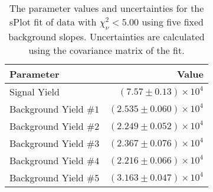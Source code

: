 
\begin{table}[ht]
    \begin{center}
        \begin{tabular}{lr}\toprule
            Parameter & Value \\\midrule
            Signal Yield & $(7.57 \pm 0.13) \times 10^{4}$ \\
            Background Yield $\#1$ & $(2.535 \pm 0.060) \times 10^{4}$ \\
            Background Yield $\#2$ & $(2.249 \pm 0.052) \times 10^{4}$ \\
            Background Yield $\#3$ & $(2.367 \pm 0.076) \times 10^{4}$ \\
            Background Yield $\#4$ & $(2.216 \pm 0.066) \times 10^{4}$ \\
            Background Yield $\#5$ & $(3.163 \pm 0.047) \times 10^{4}$ \\\bottomrule
        \end{tabular}
        \caption{The parameter values and uncertainties for the sPlot fit of data with $\chi^2_\nu < 5.00$ using five fixed background slopes. Uncertainties are calculated using the covariance matrix of the fit.}\label{tab:splot-fit-results-chisqdof-5.00-fixed-5}
    \end{center}
\end{table}
